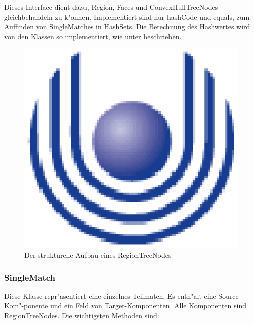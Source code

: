 Dieses Interface dient dazu, Region, Faces und ConvexHullTreeNodes gleichbehandeln zu k"onnen. Implementiert sind nur hashCode und equals, zum Auffinden von SingleMatches in HashSets. Die Berechnung des Hashwertes wird von den Klassen so implementiert, wie unter  beschrieben.

\begin{figure}
	\centering
	\includegraphics{feu_logo2.eps}
	\caption{Der strukturelle Aufbau eines RegionTreeNodes}
	\label{fig:RegionTreeNode}
\end{figure}


\subsubsection{SingleMatch}
Diese Klasse repr"asentiert eine einzelnes Teilmatch.  Es enth"alt eine Source-Kom"-ponente und ein Feld von Target-Komponenten. Alle Komponenten sind RegionTreeNodes.
Die wichtigsten Methoden sind:

